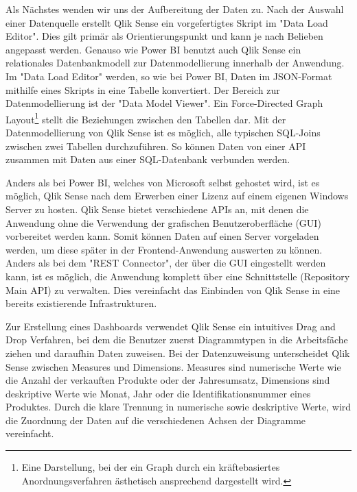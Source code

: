 Als Nächstes wenden wir uns der Aufbereitung der Daten zu. Nach der Auswahl einer Datenquelle
erstellt Qlik Sense ein vorgefertigtes Skript im "Data Load Editor". Dies gilt primär als Orientierungspunkt
und kann je nach Belieben angepasst werden. Genauso wie Power BI benutzt auch Qlik Sense ein relationales
Datenbankmodell zur Datenmodellierung innerhalb der Anwendung. Im "Data Load Editor"
werden, so wie bei Power BI, Daten im JSON-Format mithilfe eines Skripts in eine Tabelle konvertiert.
Der Bereich zur Datenmodellierung ist der "Data Model Viewer". Ein Force-Directed Graph Layout\footnote{Eine Darstellung,
bei der ein Graph durch ein kräftebasiertes Anordnungsverfahren ästhetisch ansprechend dargestellt wird.\cite{ForceDirectedGraphLayout}} stellt die
Beziehungen zwischen den Tabellen dar. Mit der Datenmodellierung von Qlik Sense ist es möglich, alle typischen SQL-Joins
zwischen zwei Tabellen durchzuführen. So können Daten von einer API zusammen mit Daten aus einer SQL-Datenbank
verbunden werden.

Anders als bei Power BI, welches von Microsoft selbst gehostet wird, ist es möglich, Qlik Sense nach dem Erwerben
einer Lizenz auf einem eigenen Windows Server zu hosten. Qlik Sense bietet verschiedene APIs an,
mit denen die Anwendung ohne die Verwendung der grafischen Benutzeroberfläche (GUI) vorbereitet werden kann. Somit können Daten
auf einen Server vorgeladen werden, um diese später in der Frontend-Anwendung auswerten zu können. Anders als bei
dem "REST Connector", der über die GUI eingestellt werden kann, ist es möglich, die Anwendung komplett über
eine Schnittstelle (Repository Main API) zu verwalten.\cite{QlikSenseRepositoryMainAPI}
Dies vereinfacht das Einbinden von Qlik Sense in eine bereits existierende Infrastrukturen.

Zur Erstellung eines Dashboards verwendet Qlik Sense ein intuitives Drag and Drop Verfahren,
bei dem die Benutzer zuerst Diagrammtypen in die Arbeitsfäche ziehen und
daraufhin Daten zuweisen. Bei der Datenzuweisung unterscheidet Qlik Sense zwischen Measures und
Dimensions. Measures sind numerische Werte wie die Anzahl der verkauften Produkte oder der Jahresumsatz,
Dimensions sind deskriptive Werte wie Monat, Jahr oder die Identifikationsnummer eines Produktes.\cite{TutorialsSpotMeasuresDimensions}
Durch die klare Trennung in numerische sowie deskriptive Werte, wird die Zuordnung der Daten
auf die verschiedenen Achsen der Diagramme vereinfacht.

